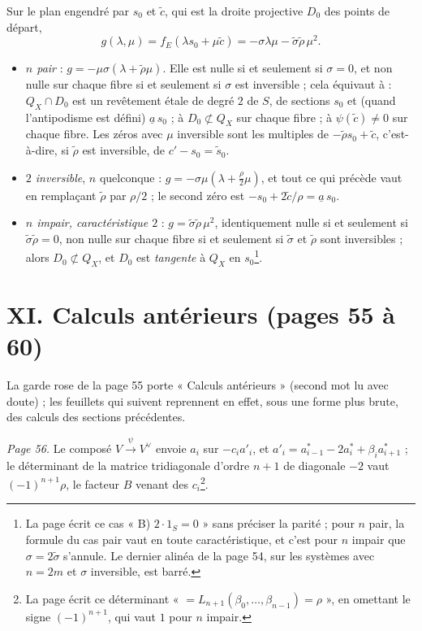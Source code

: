 \documentclass[11pt,a4paper]{article}
\begin{document}
Sur le plan engendré par $s_0$ et $\tilde c$, qui est la droite projective
$D_0$ des points de départ,
\[
g(\lambda, \mu) = f_E(\lambda s_0 + \mu\tilde c) = -\sigma\lambda\mu -
\tilde\sigma\tilde\rho\,\mu^2 .
\]
\begin{itemize}
  \item \emph{$n$ pair} : $g = -\mu\sigma(\lambda + \tilde\rho\mu)$. Elle est
    nulle si et seulement si $\sigma = 0$, et non nulle sur chaque fibre si et
    seulement si $\sigma$ est inversible ; cela équivaut à : $Q_X \cap D_0$ est
    un revêtement étale de degré $2$ de $S$, de sections $s_0$ et (quand
    l'antipodisme est défini) $\underline a\, s_0$ ; à $D_0 \not\subset Q_X$
    sur chaque fibre ; à $\psi(\tilde c) \neq 0$ sur chaque fibre. Les zéros
    avec $\mu$ inversible sont les multiples de $-\tilde\rho s_0 + \tilde c$,
    c'est-à-dire, si $\tilde\rho$ est inversible, de $c' - s_0 = \tilde s_0$.
  \item \emph{$2$ inversible}, $n$ quelconque : $g = -\sigma\mu(\lambda +
    \tfrac{\rho}{2}\mu)$, et tout ce qui précède vaut en remplaçant
    $\tilde\rho$ par $\rho/2$ ; le second zéro est $-s_0 + 2\tilde c/\rho =
    \underline a\, s_0$.
  \item \emph{$n$ impair, caractéristique $2$} : $g = \tilde\sigma\tilde\rho\,
    \mu^2$, identiquement nulle si et seulement si $\tilde\sigma\tilde\rho =
    0$, non nulle sur chaque fibre si et seulement si $\tilde\sigma$ et
    $\tilde\rho$ sont inversibles ; alors $D_0 \not\subset Q_X$, et $D_0$ est
    \emph{tangente} à $Q_X$ en $s_0$\footnote{La page écrit ce cas « B) $2
    \cdot 1_S = 0$ » sans préciser la parité ; pour $n$ pair, la formule du
    cas pair vaut en toute caractéristique, et c'est pour $n$ impair que
    $\sigma = 2\tilde\sigma$ s'annule. Le dernier alinéa de la page 54, sur les
    systèmes avec $n = 2m$ et $\sigma$ inversible, est barré.}.
\end{itemize}

\section*{XI. Calculs antérieurs (pages 55 à 60)}

La garde rose de la page 55 porte « Calculs antérieurs » (second mot lu avec
doute) ; les feuillets qui suivent reprennent en effet, sous une forme plus
brute, des calculs des sections précédentes.

\emph{Page 56.} Le composé $V \xrightarrow{\psi} V^\vee$ envoie $a_i$ sur $-c_i
a'_i$, et $a'_i = a^*_{i-1} - 2a^*_i + \beta_i a^*_{i+1}$ ; le déterminant de la
matrice tridiagonale d'ordre $n+1$ de diagonale $-2$ vaut $(-1)^{n+1}\rho$, le
facteur $B$ venant des $c_i$\footnote{La page écrit ce déterminant
« $= L_{n+1}(\beta_0, \ldots, \beta_{n-1}) = \rho$ », en omettant le signe
$(-1)^{n+1}$, qui vaut $1$ pour $n$ impair.}.
\end{document}
